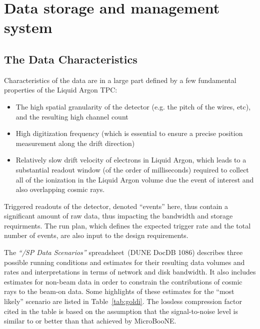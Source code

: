 \section{Data storage and management system}

\subsection{The \pd Data Characteristics}
Characteristics of the \pd data are in a large part defined by a few fundamental
properties of the \pd Liquid Argon TPC:
\begin{itemize}
\item The high spatial granularity of the detector (e.g. the pitch of the wires, etc), and the resulting high channel count
\item High digitization frequency (which is essential to ensure a precise position measurement along the drift direction)
\item Relatively slow drift velocity of electrons in Liquid Argon, which  leads to a substantial readout window (of the order of milliseconds) required to collect
all of the ionization in the Liquid Argon volume due the event of interest and also overlapping cosmic rays.
\end{itemize}

\noindent Triggered readouts of the detector, denoted ``events'' here, 
thus contain a significant amount of raw data, thus impacting the bandwidth and
storage requirments.   The run plan, which defines the expected trigger rate
and the total number of events, are also input to the design requirements.

The \textit{``\pd/SP Data Scenarios''} spreadsheet\,\cite{data_spreadsheet}
(DUNE DocDB 1086)
describes three possible running conditions and estimates for their
resulting data volumes and rates and interpretations in terms of
network and disk bandwidth.  It also includes estimates for non-beam
data in order to constrain the contributions of cosmic rays to the beam-on data.  Some highlights
of these estimates for the ``most likely'' scenario
are listed in Table~\ref{tab:goldi}. The lossless compression factor cited
in the table is based on the assumption that the signal-to-noise level 
is similar to or better than that achieved by MicroBooNE.

